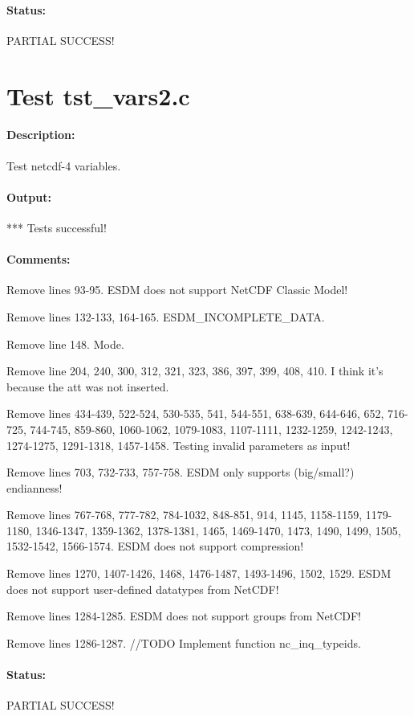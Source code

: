 \paragraph{Status:} PARTIAL SUCCESS!

\section{Test tst\_vars2.c}

\paragraph{Description:} Test netcdf-4 variables.

\paragraph{Output:} *** Tests successful!

\paragraph{Comments:} Remove lines 93-95. ESDM does not support NetCDF Classic Model!

Remove lines 132-133, 164-165. ESDM\_INCOMPLETE\_DATA.

Remove line 148. Mode.

Remove line 204, 240, 300, 312, 321, 323, 386, 397, 399, 408, 410. I think it's because the att was not inserted.

Remove lines 434-439, 522-524, 530-535, 541, 544-551, 638-639, 644-646, 652, 716-725, 744-745, 859-860, 1060-1062, 1079-1083, 1107-1111, 1232-1259, 1242-1243, 1274-1275, 1291-1318, 1457-1458. Testing invalid parameters as input!

Remove lines 703, 732-733, 757-758. ESDM only supports (big/small?) endianness!

Remove lines 767-768, 777-782, 784-1032, 848-851, 914, 1145, 1158-1159, 1179-1180, 1346-1347, 1359-1362, 1378-1381, 1465, 1469-1470, 1473, 1490, 1499, 1505, 1532-1542, 1566-1574. ESDM does not support compression!

Remove lines 1270, 1407-1426, 1468, 1476-1487, 1493-1496, 1502, 1529. ESDM does not support user-defined datatypes from NetCDF!

Remove lines 1284-1285. ESDM does not support groups from NetCDF!

Remove lines 1286-1287. //TODO Implement function nc\_inq\_typeids.

\paragraph{Status:} PARTIAL SUCCESS!

